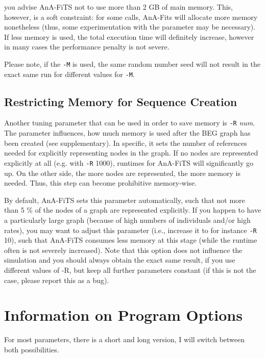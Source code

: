 \documentclass{scrartcl}
\newcommand{\prog}[1]{\texttt{#1}}
\begin{document}
you advise AnA-FiTS not to use more than 2 GB of main memory. This,
however, is a soft constraint: for some calls, AnA-Fits will allocate
more memory nonetheless (thus, some experimentation with the parameter
may be necessary). If less memory is used, the total execution time
will definitely increase, however in many cases the performance
penalty is not severe.

Please note, if the \prog{-M} is used, the same random number seed
will not result in the exact same run for different values for
\prog{-M}. 

\subsection{Restricting Memory for Sequence Creation}
\label{sec:restr-memory-sequ}

Another tuning parameter that can be used in order to save memory is
\prog{-R} \textit{num}. The parameter influences, how much memory is
used after the BEG graph has been created (see supplementary). In
specific, it sets the number of references needed for explicitly
representing nodes in the graph. If no nodes are represented
explicitly at all (e.g. with \prog{-R} 1000), runtimes for AnA-FiTS will
significantly go up. On the other side, the more nodes are
represented, the more memory is needed. Thus, this step can become
prohibitive memory-wise. 

By default, AnA-FiTS sets this parameter automatically, such that not
more than 5 \% of the nodes of a graph are represented explicitly. If
you happen to have a particularly large graph (because of high numbers
of individuals and/or high rates), you may want to adjust this
parameter (i.e., increase it to for instance \prog{-R} 10), such that
AnA-FiTS consumes less memory at this stage (while the runtime often
is not severely increased). Note that this option does not influence
the simulation and you should always obtain the exact same result, if
you use different values of -R, but keep all further parameters
constant (if this is not the case, please report this as a bug). 



\section{Information on Program Options}
\label{sec:walk-through-options}

For most parameters, there is a short and long version, I will switch
between both possibilities. 
\end{document}
